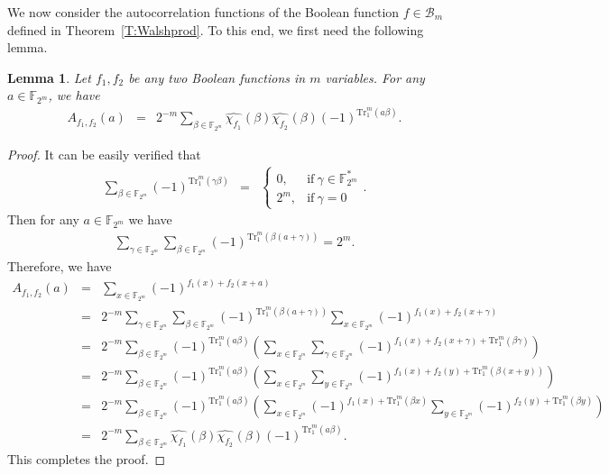 \documentclass[10pt]{article}
\newtheorem{lemma}{Lemma}
\newcommand{\F}{\mathbb{F}}
\newcommand{\0}{\textbf{0}}
\newcommand{\1}{\textbf{1}}
\newcommand{\Tr}{\mathrm{Tr}_1^m}
\newcommand{\W}[2][]{\widehat{\chi_{#2}}^{#1}}
\begin{document}
{We now consider the autocorrelation functions of the  Boolean function $f\in\mathcal{B}_m$ defined in Theorem~\ref{T:Walshprod}.
To this end, we first need the following lemma.
\begin{lemma}\label{L:crossA}
Let $f_1,f_2$ be any two Boolean functions in $m$ variables.
For any ${a}\in\F_{2^m}$, we have
\begin{eqnarray*}
A_{f_1,f_2}({a})&=&2^{-m}\sum_{\beta\in\F_{2^m}}\W{f_1}(\beta)\W{f_2}(\beta)(-1)^{\Tr({a}\beta)}.
\end{eqnarray*}
\end{lemma}
\begin{proof}
It can be easily verified that
\begin{eqnarray*}
\sum_{\beta\in\F_{2^m}}(-1)^{\Tr(\gamma\beta)}
&=& \left\{
\begin{array}{llllll}
0,&\mathrm{if~}\gamma\in\F_{2^m}^*\\
2^m,&\mathrm{if~}\gamma=0
\end{array}
\right..
\end{eqnarray*}
Then for any ${a}\in\F_{2^m}$ we have
\begin{eqnarray*}\label{E:}
\sum_{\gamma\in\F_{2^m}}\sum_{\beta\in\F_{2^m}}(-1)^{\Tr(\beta({a}+\gamma))}=2^m.
\end{eqnarray*}
Therefore, we have
\begin{eqnarray*}
A_{f_1,f_2}({a})&=&\sum_{x\in\F_{2^m}}(-1)^{f_1(x)+f_2(x+{a})}\\
&=&2^{-m}\sum_{\gamma\in\F_{2^m}}\sum_{\beta\in\F_{2^m}}(-1)^{\Tr(\beta({a}+\gamma))}\sum_{x\in\F_{2^m}}(-1)^{f_1(x)+f_2(x+\gamma)}\\
&=&2^{-m}\sum_{\beta\in\F_{2^m}}(-1)^{\Tr({a}\beta)}\left(\sum_{x\in\F_{2^m}}\sum_{\gamma\in\F_{2^m}}(-1)^{f_1(x)+f_2(x+\gamma)+\Tr(\beta\gamma)} \right)\\
&=&2^{-m}\sum_{\beta\in\F_{2^m}}(-1)^{\Tr({a}\beta)}\left(\sum_{x\in\F_{2^m}}\sum_{y\in\F_{2^m}}(-1)^{f_1(x)+f_2(y)+\Tr(\beta(x+y))} \right)\\
&=&2^{-m}\sum_{\beta\in\F_{2^m}}(-1)^{\Tr({a}\beta)}\left(\sum_{x\in\F_{2^m}}(-1)^{f_1(x)+\Tr(\beta x)}\sum_{y\in\F_{2^m}}(-1)^{f_2(y)+\Tr(\beta y)} \right)\\
&=&2^{-m}\sum_{\beta\in\F_{2^m}}\W{f_1}(\beta)\W{f_2}(\beta)(-1)^{\Tr({a}\beta)}.
\end{eqnarray*}
This completes the proof.
\end{proof}

}
\end{document}
